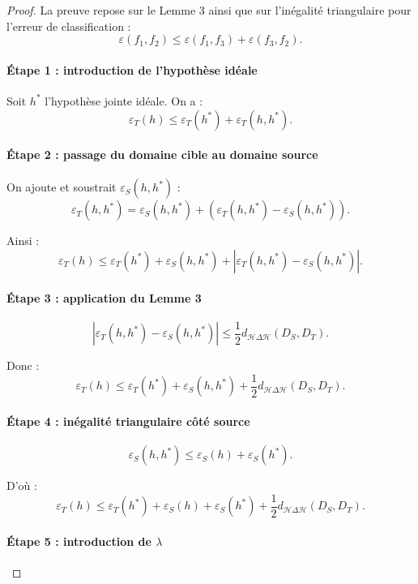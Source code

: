 \documentclass[a4paper,12pt]{article}
\theoremstyle{definition}
\theoremstyle{remark}
\begin{document}
\begin{proof}

La preuve repose sur le Lemme 3 ainsi que sur l’inégalité triangulaire pour l’erreur de classification :
\[
\varepsilon(f_1, f_2) \le \varepsilon(f_1, f_3) + \varepsilon(f_3, f_2).
\]

\paragraph{Étape 1 : introduction de l’hypothèse idéale}

Soit $h^*$ l’hypothèse jointe idéale. On a :
\[
\varepsilon_T(h)
\le
\varepsilon_T(h^*) + \varepsilon_T(h, h^*).
\]

\paragraph{Étape 2 : passage du domaine cible au domaine source}

On ajoute et soustrait $\varepsilon_S(h, h^*)$ :
\[
\varepsilon_T(h, h^*)
=
\varepsilon_S(h, h^*)
+ \left( \varepsilon_T(h, h^*) - \varepsilon_S(h, h^*) \right).
\]

Ainsi :
\[
\varepsilon_T(h)
\le
\varepsilon_T(h^*) + \varepsilon_S(h, h^*)
+ \left| \varepsilon_T(h, h^*) - \varepsilon_S(h, h^*) \right|.
\]

\paragraph{Étape 3 : application du Lemme 3}

\[
\left| \varepsilon_T(h, h^*) - \varepsilon_S(h, h^*) \right|
\le
\frac{1}{2} d_{\mathcal{H} \Delta \mathcal{H}}(D_S, D_T).
\]

Donc :
\[
\varepsilon_T(h)
\le
\varepsilon_T(h^*) + \varepsilon_S(h, h^*)
+ \frac{1}{2} d_{\mathcal{H} \Delta \mathcal{H}}(D_S, D_T).
\]

\paragraph{Étape 4 : inégalité triangulaire côté source}

\[
\varepsilon_S(h, h^*)
\le
\varepsilon_S(h) + \varepsilon_S(h^*).
\]

D’où :
\[
\varepsilon_T(h)
\le
\varepsilon_T(h^*) + \varepsilon_S(h) + \varepsilon_S(h^*)
+ \frac{1}{2} d_{\mathcal{H} \Delta \mathcal{H}}(D_S, D_T).
\]

\paragraph{Étape 5 : introduction de $\lambda$}


\end{proof}
\end{document}
